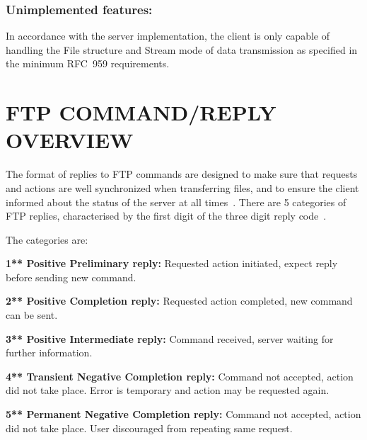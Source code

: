 \documentclass[10pt,twocolumn]{witseiepaper}
\begin{document}




\vspace*{-\baselineskip}
\subsubsection*{Unimplemented features: } 
In accordance with the server implementation, the client is only capable of handling the File structure and Stream mode of data transmission as specified in the minimum RFC~959 requirements.



\section{FTP COMMAND/REPLY OVERVIEW}\label{sec:command/reply}

The format of replies to FTP commands are designed to make sure that requests and actions are well synchronized when transferring files, and to ensure the client informed about the status of the server at all times~\cite{rfc959}. There are 5 categories of FTP replies, characterised by the first digit of the three digit reply code~\cite{rfc959}. 

The categories are: 

\textbf{1**	Positive Preliminary reply:} 
Requested action initiated, expect reply before sending new command.

\textbf{2**	Positive Completion reply:} 
Requested action completed, new command can be sent.

\textbf{3**   Positive Intermediate reply:} 
Command received, server waiting for further information.

\textbf{4**   Transient Negative Completion reply:} 
Command not accepted, action did not take place. Error is temporary and action may be requested again.

\textbf{5**   Permanent Negative Completion reply:} 
Command not accepted, action did not take place. User discouraged from repeating same request.
\end{document}
